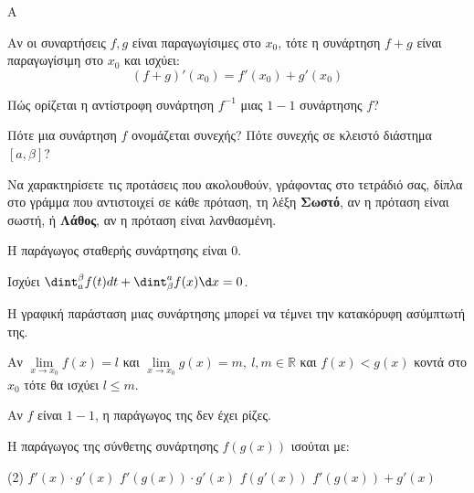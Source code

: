 \begin{thema}{A}
\begin{erwthma}
    \item Αν οι συναρτήσεις $ f,g $ είναι παραγωγίσιμες στο $ x_0 $, τότε η συνάρτηση $ f+g $ είναι παραγωγίσιμη στο $ x_0 $ και ισχύει: \[ (f+g)'(x_0)=f'(x_0)+g'(x_0) \]
    \item Πώς ορίζεται η αντίστροφη συνάρτηση $f^{-1}$ μιας $1-1$ συνάρτησης $f$?
    \item Πότε μια συνάρτηση $f$ ονομάζεται συνεχής? Πότε συνεχής σε κλειστό διάστημα $[a, \beta]$?
    \item Να χαρακτηρίσετε τις προτάσεις που ακολουθούν, γράφοντας στο τετράδιό σας, δίπλα στο γράμμα που αντιστοιχεί σε κάθε πρόταση, τη λέξη \textbf{Σωστό}, αν η πρόταση είναι σωστή, ή \textbf{Λάθος}, αν η πρόταση είναι λανθασμένη.
    \begin{alist}
        \item Η παράγωγος σταθερής συνάρτησης είναι $0$.
        \item Ισχύει $\dint_a^\beta f(t) dt + \dint_\beta^a f(x) \d x = 0$.
        \item Η γραφική παράσταση μιας συνάρτησης μπορεί να τέμνει την κατακόρυφη ασύμπτωτή της.
        \item Αν $\lim\limits_{x\to x_0}{f(x)}=l$ και $\lim\limits_{x\to x_0}{g(x)}=m,\ l,m\in\mathbb{R}$ και $f(x)<g(x)$ κοντά στο $x_0$ τότε θα ισχύει $l\leq m$.
        \item Αν $f$ είναι $1-1$, η παράγωγος της δεν έχει ρίζες.
    \end{alist}
    \item Η παράγωγος της σύνθετης συνάρτησης $f(g(x))$ ισούται με:
    \begin{tasks}[label=\let\textdexiakeraia\relax\alph*.](2)
        \task $f'(x) \cdot g'(x)$
        \task $f'(g(x)) \cdot g'(x)$
        \task $f(g'(x))$
        \task $f'(g(x)) + g'(x)$
    \end{tasks}
\end{erwthma}
\end{thema}
